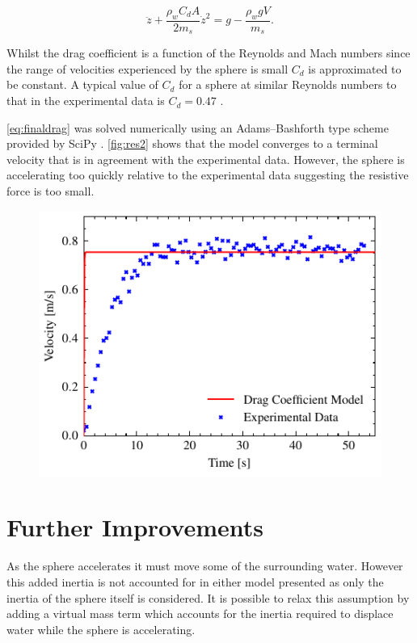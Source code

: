 \documentclass[10pt,a4paper, twocolumn]{article}
\begin{document}
	\begin{equation}
		\ddot{z} + \frac{\rho_w C_d A}{2m_s}\dot{z}^2 = g  - \frac{\rho_w g V}{m_s}.		
		\label{eq:finaldrag}
	\end{equation}
	
	Whilst the drag coefficient is a function of the Reynolds and Mach numbers since the range of velocities experienced by the sphere is small $C_d$ is approximated to be constant. A typical value of $C_d$ for a sphere at similar Reynolds numbers to that in the experimental data is $C_d = 0.47$ \cite{drag}.
	
	\autoref{eq:finaldrag} was solved numerically using an Adams–Bashforth type scheme provided by SciPy \cite{2020SciPy-NMeth}. \autoref{fig:res2} shows that the model converges to a terminal velocity that is in agreement with the experimental data. However, the sphere is accelerating too quickly relative to the experimental data suggesting the resistive force is too small.
	
	\begin{figure}[!h]
		\centering
		\includegraphics[width=\linewidth]{../better_comparison}
		\label{fig:res2}
	\end{figure}
	
	\section{Further Improvements}
	
	As the sphere accelerates it must move some of the surrounding water. However this added inertia is not accounted for in either model presented as only the inertia of the sphere itself is considered. It is possible to relax this assumption by adding a virtual mass term \cite{white_fluid_2009} which accounts for the inertia required to displace water while the sphere is accelerating.
	
\end{document}
